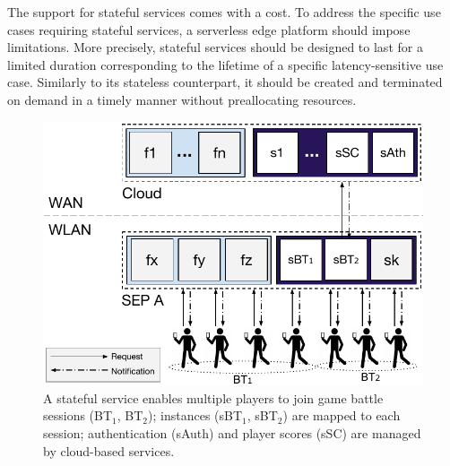 The support for stateful services comes with a cost. To address the specific use cases requiring stateful services, a serverless edge platform should impose limitations. More precisely, stateful services should be designed to last for a limited duration corresponding to the lifetime of a specific latency-sensitive use case. Similarly to its stateless counterpart, it should be created and terminated on demand in a timely manner without preallocating resources.


\begin{figure}[tbp]
	\centering
	\includegraphics[width=\linewidth]{Figs/Stateful_Edge_Services.pdf}
	\caption{A stateful service enables multiple players to join game battle sessions (BT$_1$, BT$_2$); instances (sBT$_1$, sBT$_2$) are mapped to each session; authentication (sAuth) and player scores (sSC) are managed by cloud-based services.}
	\label{fig:Steteful_Edge_MMG}
\end{figure}





